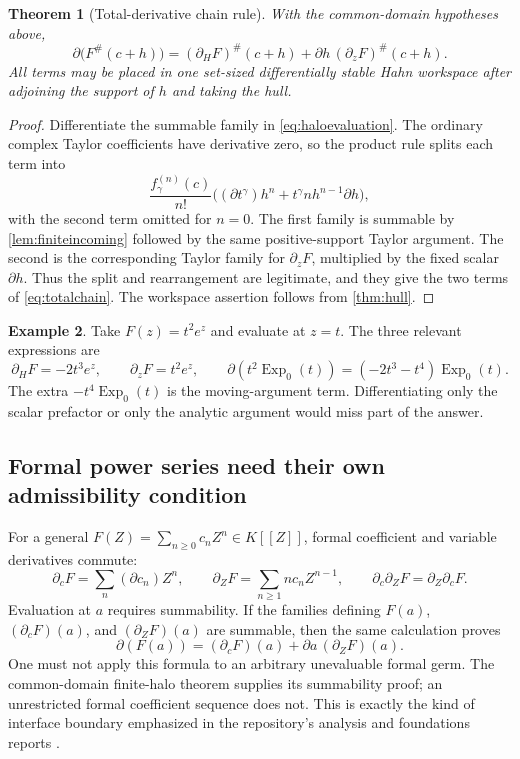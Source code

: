 \documentclass[11pt,a4paper]{article}
\newtheorem{theorem}{Theorem}[section]
\theoremstyle{definition}
\newtheorem{example}[theorem]{Example}
\newcommand{\D}{\partial}
\newcommand{\Expzero}{\operatorname{Exp}_0}
\numberwithin{equation}{section}
\begin{document}
\begin{theorem}[Total-derivative chain rule]\label{thm:totalchain}
With the common-domain hypotheses above,
\begin{equation}\label{eq:totalchain}
 \D\bigl(F^\#(c+h)\bigr)
 = (\D_HF)^\#(c+h)
   +\D h\,(\partial_zF)^\#(c+h).
\end{equation}
All terms may be placed in one set-sized differentially stable Hahn
workspace after adjoining the support of $h$ and taking the hull.
\end{theorem}
\begin{proof}
Differentiate the summable family in \eqref{eq:haloevaluation}. The
ordinary complex Taylor coefficients have derivative zero, so the
product rule splits each term into
\[
 \frac{f_\gamma^{(n)}(c)}{n!}
 \bigl((\D t^\gamma)h^n
      +t^\gamma n h^{n-1}\D h\bigr),
\]
with the second term omitted for $n=0$. The first family is summable by
\cref{lem:finiteincoming} followed by the same positive-support Taylor
argument. The second is the corresponding Taylor family for
$\partial_zF$, multiplied by the fixed scalar $\D h$. Thus the split
and rearrangement are legitimate, and they give the two terms of
\eqref{eq:totalchain}. The workspace assertion follows from
\cref{thm:hull}.
\end{proof}

\begin{example}\label{ex:totalchain}
Take $F(z)=t^2e^z$ and evaluate at $z=t$. The three relevant expressions
are
\[
 \D_HF=-2t^3e^z,\qquad
 \partial_zF=t^2e^z,\qquad
 \D(t^2\Expzero(t))=(-2t^3-t^4)\Expzero(t).
\]
The extra $-t^4\Expzero(t)$ is the moving-argument term. Differentiating
only the scalar prefactor or only the analytic argument would miss part
of the answer.
\end{example}

\subsection{Formal power series need their own admissibility condition}
For a general $F(Z)=\sum_{n\ge0}c_nZ^n\in K[[Z]]$, formal coefficient
and variable derivatives commute:
\[
 \D_cF=\sum_n(\D c_n)Z^n,\qquad
 \partial_ZF=\sum_{n\ge1}n c_nZ^{n-1},\qquad
 \D_c\partial_ZF=\partial_Z\D_cF.
\]
Evaluation at $a$ requires summability. If the families defining
$F(a)$, $(\D_cF)(a)$, and $(\partial_ZF)(a)$ are summable, then the same
calculation proves
\[
 \D(F(a))=(\D_cF)(a)+\D a\,(\partial_ZF)(a).
\]
One must not apply this formula to an arbitrary unevaluable formal germ.
The common-domain finite-halo theorem supplies its summability proof;
an unrestricted formal coefficient sequence does not. This is exactly
the kind of interface boundary emphasized in the repository's analysis
and foundations reports \cite{RepoAnalysis,RepoFound}.
\end{document}
